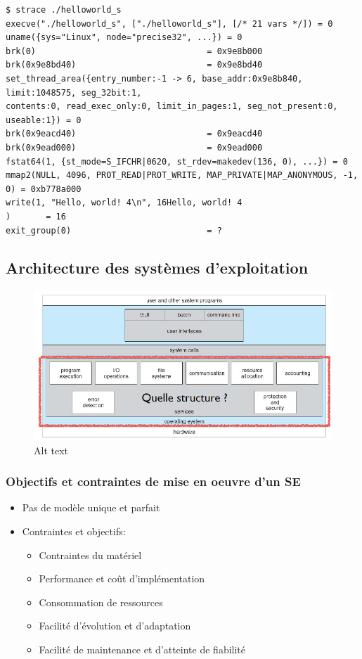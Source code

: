 \begin{verbatim}
$ strace ./helloworld_s
execve("./helloworld_s", ["./helloworld_s"], [/* 21 vars */]) = 0
uname({sys="Linux", node="precise32", ...}) = 0
brk(0)                                  = 0x9e8b000
brk(0x9e8bd40)                          = 0x9e8bd40
set_thread_area({entry_number:-1 -> 6, base_addr:0x9e8b840, limit:1048575, seg_32bit:1, 
contents:0, read_exec_only:0, limit_in_pages:1, seg_not_present:0, useable:1}) = 0
brk(0x9eacd40)                          = 0x9eacd40
brk(0x9ead000)                          = 0x9ead000
fstat64(1, {st_mode=S_IFCHR|0620, st_rdev=makedev(136, 0), ...}) = 0
mmap2(NULL, 4096, PROT_READ|PROT_WRITE, MAP_PRIVATE|MAP_ANONYMOUS, -1, 0) = 0xb778a000
write(1, "Hello, world! 4\n", 16Hello, world! 4
)       = 16
exit_group(0)                           = ?
\end{verbatim}

\subsection{Architecture des systèmes
d'exploitation}\label{architecture-des-systuxe8mes-dexploitation}

\begin{figure}
\centering
\includegraphics{image-15.png}
\caption{Alt text}
\end{figure}

\subsubsection{Objectifs et contraintes de mise en oeuvre d'un
SE}\label{objectifs-et-contraintes-de-mise-en-oeuvre-dun-se}

\begin{itemize}
\tightlist
\item
  Pas de modèle unique et parfait
\item
  Contraintes et objectifs:

  \begin{itemize}
  \tightlist
  \item
    Contraintes du matériel
  \item
    Performance et coût d'implémentation
  \item
    Consommation de ressources
  \item
    Facilité d'évolution et d'adaptation
  \item
    Facilité de maintenance et d'atteinte de fiabilité
  \end{itemize}
\end{itemize}

